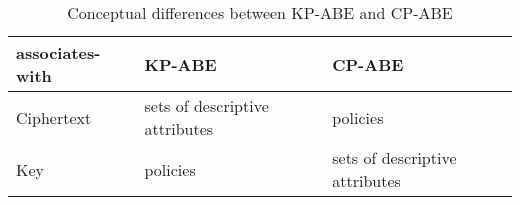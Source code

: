 \begin{table}[H]
\begin{center}
\begin{tabular}{l|ll}
\textbf{associates-with} & KP-ABE                         & CP-ABE                         \\ \hline
Ciphertext               & sets of descriptive attributes & policies                       \\
Key                      & policies                       & sets of descriptive attributes
\end{tabular}
\caption{Conceptual differences between \acrshort{KP-ABE} and \acrshort{CP-ABE}}
\label{table:abe-comparison}
\end{center}
\end{table}